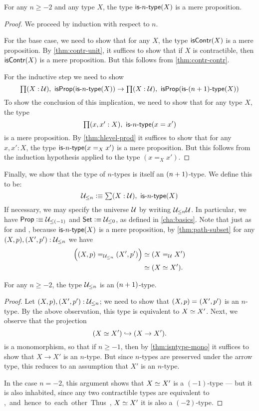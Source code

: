 \begin{thm}\label{thm:isaprop-isofhlevel}
 For any $n \geq -2$ and any type $X$, the type $\istype{n}(X)$ is a mere proposition.
\end{thm}
\begin{proof}
  We proceed by induction with respect to $n$.

 For the base case, we need to show that for any $X$, the type $\iscontr(X)$ is a mere proposition.
 By \autoref{thm:contr-unit}, it suffices to show that if $X$ is contractible, then $\iscontr(X)$ is a mere proposition.
 But this follows from \autoref{thm:contr-contr}.

For the inductive step we need to show
\[\prd{X : \type} \isprop (\istype{n}(X)) \to \prd{X : \type} \isprop (\istype{\nplusone}(X)) \]
To show the conclusion of this implication, we need to show that for any type $X$, the type
\[\prd{x, x' : X}\istype{n}(x = x')\]
is a mere proposition. By \autoref{thm:hlevel-prod} it suffices to show that for any $x, x' : X$, the type $\istype{n}(x =_X x')$ is a mere
proposition.
But this follows from the induction hypothesis applied to the type $(x =_X x')$.
\end{proof}

Finally, we show that the type of $n$-types is itself an $\nplusone$-type.
We define this to be:
\[\ntype{n} \defeq \sm{X : \type} \istype{n}(X) \]
If necessary, we may specify the universe $\UU$ by writing ${\ntype{n}}\UU$.
In particular, we have $\prop \defeq \ntype{(-1)}$ and $\set \defeq \ntype{0}$, as defined in \autoref{cha:basics}.
Note that just as for \prop and \set, because $\istype{n}(X)$ is a mere proposition, by \autoref{thm:path-subset} for any $(X,p), (X',p'):\ntype{n}$ we have
\begin{align*}
  \Big(\id[\ntype{n}]{(X, p)}{(X', p')}\Big) &\simeq (\id[\type] X X')\\
  &\simeq (\eqv{X}{X'}).
\end{align*}

\begin{thm}\label{thm:hleveln-of-hlevelSn}
 For any $n \geq -2$, the type $\ntype{n}$ is an $\nplusone$-type.
\end{thm}
\begin{proof}%
  Let $(X, p), (X', p') : \ntype{n}$; we need to show that $\id{(X, p)}{(X', p')}$ is an $n$-type.
  By the above observation, this type is equivalent to $\eqv{X}{X'}$.
  Next, we observe that the projection
  \[(\eqv{X}{X'}) \hookrightarrow (X \rightarrow X').\]
  is a monomorphism, so that if $n\geq -1$, then by \autoref{thm:isntype-mono} it suffices to show that $X \rightarrow X'$ is an $n$-type.
  But since $n$-types are preserved under the arrow type, this reduces to an assumption that $X'$ is an $n$-type.

  In the case $n=-2$, this argument shows that $\eqv{X}{X'}$ is a $(-1)$-type --- but it is also inhabited, since any two contractible types
are equivalent to \unit, and hence to each other.
  Thus, $\eqv{X}{X'}$ it is also a $(-2)$-type.
\end{proof}

